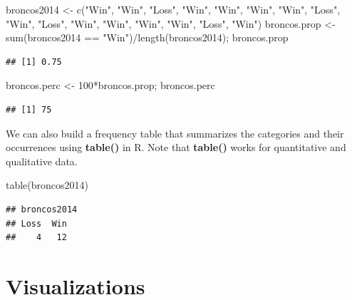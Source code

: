 \documentclass[
  11pt,
]{book}
\newenvironment{Shaded}{\begin{snugshade}}{\end{snugshade}}
\newcommand{\DecValTok}[1]{\textcolor[rgb]{0.00,0.00,0.81}{#1}}
\newcommand{\FunctionTok}[1]{\textcolor[rgb]{0.00,0.00,0.00}{#1}}
\newcommand{\NormalTok}[1]{#1}
\newcommand{\OtherTok}[1]{\textcolor[rgb]{0.56,0.35,0.01}{#1}}
\newcommand{\SpecialCharTok}[1]{\textcolor[rgb]{0.00,0.00,0.00}{#1}}
\newcommand{\StringTok}[1]{\textcolor[rgb]{0.31,0.60,0.02}{#1}}
\theoremstyle{definition}
\theoremstyle{definition}
\theoremstyle{definition}
\theoremstyle{definition}
\theoremstyle{remark}
\begin{document}
\begin{Shaded}
\begin{Highlighting}[]
\NormalTok{broncos2014 }\OtherTok{\textless{}{-}} 
  \FunctionTok{c}\NormalTok{(}\StringTok{"Win"}\NormalTok{, }\StringTok{"Win"}\NormalTok{, }\StringTok{"Loss"}\NormalTok{, }\StringTok{"Win"}\NormalTok{, }\StringTok{"Win"}\NormalTok{, }\StringTok{"Win"}\NormalTok{, }\StringTok{"Win"}\NormalTok{, }\StringTok{"Loss"}\NormalTok{,}
    \StringTok{"Win"}\NormalTok{, }\StringTok{"Loss"}\NormalTok{, }\StringTok{"Win"}\NormalTok{, }\StringTok{"Win"}\NormalTok{, }\StringTok{"Win"}\NormalTok{, }\StringTok{"Win"}\NormalTok{, }\StringTok{"Loss"}\NormalTok{, }\StringTok{"Win"}\NormalTok{)}
\NormalTok{broncos.prop }\OtherTok{\textless{}{-}} \FunctionTok{sum}\NormalTok{(broncos2014 }\SpecialCharTok{==} \StringTok{"Win"}\NormalTok{)}\SpecialCharTok{/}\FunctionTok{length}\NormalTok{(broncos2014); broncos.prop}
\end{Highlighting}
\end{Shaded}

\begin{verbatim}
## [1] 0.75
\end{verbatim}

\begin{Shaded}
\begin{Highlighting}[]
\NormalTok{broncos.perc }\OtherTok{\textless{}{-}} \DecValTok{100}\SpecialCharTok{*}\NormalTok{broncos.prop; broncos.perc}
\end{Highlighting}
\end{Shaded}

\begin{verbatim}
## [1] 75
\end{verbatim}

We can also build a frequency table that summarizes the categories and their occurrences using \textbf{table()} in R. Note that \textbf{table()} works for quantitative and qualitative data.

\begin{Shaded}
\begin{Highlighting}[]
\FunctionTok{table}\NormalTok{(broncos2014)}
\end{Highlighting}
\end{Shaded}

\begin{verbatim}
## broncos2014
## Loss  Win 
##    4   12
\end{verbatim}

\newpage

\hypertarget{visualizations}{%
\section{Visualizations}\label{visualizations}}
\end{document}
